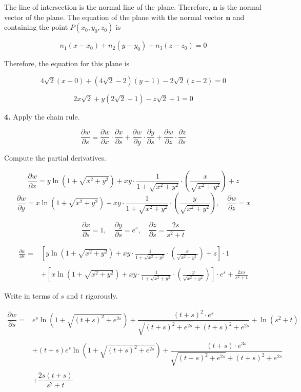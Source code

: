 \documentclass{article}
\begin{document}
The line of intersection is the normal line of the plane. Therefore, $\mathbf n$ is the normal vector of the plane. The equation of the plane with the normal vector $\mathbf n$ and containing the point $P(x_0,y_0,z_0)$ is

\[n_1(x-x_0)+n_2(y-y_0)+n_3(z-z_0)=0\]

Therefore, the equation for this plane is

\[4\sqrt2(x-0)+\left(4\sqrt2-2\right)(y-1)-2\sqrt2(z-2)=0\]

\[\boxed{2x\sqrt2+y\left(2\sqrt2-1\right)-z\sqrt2+1=0}\]

\vspace{1em}

\textbf{4.} Apply the chain rule.

\[\frac{\partial w}{\partial s}=\frac{\partial w}{\partial x}\cdot\frac{\partial x}{\partial s}+\frac{\partial w}{\partial y}\cdot\frac{\partial y}{\partial s}+\frac{\partial w}{\partial z}\cdot\frac{\partial z}{\partial s}\]

Compute the partial derivatives.

\[\frac{\partial w}{\partial x}=y\ln\left(1+\sqrt{x^2+y^2}\right)+xy\cdot\frac1{1+\sqrt{x^2+y^2}}\cdot\left(\frac{x}{\sqrt{x^2+y^2}}\right)+z\]
\[\frac{\partial w}{\partial y}=x\ln\left(1+\sqrt{x^2+y^2}\right)+xy\cdot\frac1{1+\sqrt{x^2+y^2}}\cdot\left(\frac{y}{\sqrt{x^2+y^2}}\right),\quad \frac{\partial w}{\partial z}=x\]

\[\frac{\partial x}{\partial s}=1,\quad\frac{\partial y}{\partial s}={e}^s,\quad\frac{\partial z}{\partial s}=\frac{2s}{s^2+t}\]

\begin{align*}\frac{\partial w}{\partial s}=&\left[y\ln\left(1+\sqrt{x^2+y^2}\right)+xy\cdot\frac1{1+\sqrt{x^2+y^2}}\cdot\left(\frac{x}{\sqrt{x^2+y^2}}\right)+z\right]\cdot1\\\\&+\left[x\ln\left(1+\sqrt{x^2+y^2}\right)+xy\cdot\frac1{1+\sqrt{x^2+y^2}}\cdot\left(\frac{y}{\sqrt{x^2+y^2}}\right)\right]\cdot{e}^s+\frac{2xs}{s^2+t}\end{align*}

Write in terms of $s$ and $t$ rigorously.

\[\boxed{\begin{array}{ll}\dfrac{\partial w}{\partial s}=&
{e}^s\ln\left(1+\sqrt{(t+s)^2+{e}^{2s}}\right)+\dfrac{(t+s)^2\cdot{e}^s}{\sqrt{(t+s)^2+{e}^{2s}}+(t+s)^2+{e}^{2s}}+\ln\left(s^2+t\right)\\\\&+(t+s){e}^s\ln\left(1+\sqrt{(t+s)^2+{e}^{2s}}\right)+\dfrac{(t+s)\cdot{e}^{3s}}{\sqrt{(t+s)^2+{e}^{2s}}+(t+s)^2+{e}^{2s}}\\\\&+\dfrac{2s(t+s)}{s^2+t}
\end{array}}\]
\end{document}

